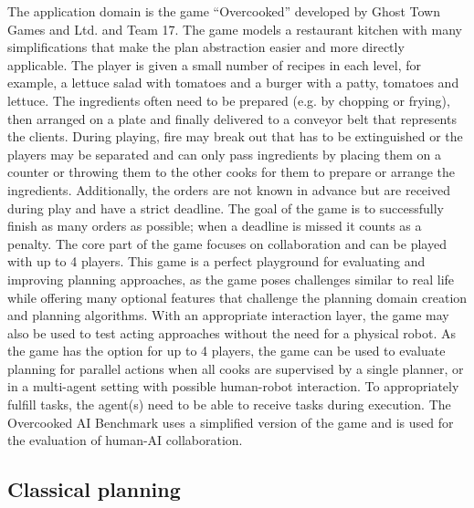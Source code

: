 The application domain is the game ``Overcooked'' developed by Ghost Town Games and Ltd. and Team 17.
The game models a restaurant kitchen with many simplifications that make the plan abstraction easier and more directly applicable.
The player is given a small number of recipes in each level, for example, a lettuce salad with tomatoes and a burger with a patty, tomatoes and lettuce.
The ingredients often need to be prepared (e.g. by chopping or frying), then arranged on a plate and finally delivered to a conveyor belt that represents the clients.
During playing, fire may break out that has to be extinguished or the players may be separated and can only pass ingredients by placing them on a counter or throwing them to the other cooks for them to prepare or arrange the ingredients.
Additionally, the orders are not known in advance but are received during play and have a strict deadline.
The goal of the game is to successfully finish as many orders as possible; when a deadline is missed it counts as a penalty.
The core part of the game focuses on collaboration and can be played with up to 4 players.
This game is a perfect playground for evaluating and improving planning approaches, as the game poses challenges similar to real life while offering many optional features that challenge the planning domain creation and planning algorithms.
With an appropriate interaction layer, the game may also be used to test acting approaches without the need for a physical robot.
As the game has the option for up to 4 players, the game can be used to evaluate planning for parallel actions when all cooks are supervised by a single planner, or in a multi-agent setting with possible human-robot interaction. 
To appropriately fulfill tasks, the agent(s) need to be able to receive tasks during execution.
The Overcooked AI Benchmark \citep{carrollUtilityLearningHumans2019} uses a simplified version of the game and is used for the evaluation of human-AI collaboration.


\subsection{Classical planning}\label{sec:classical-planning}

